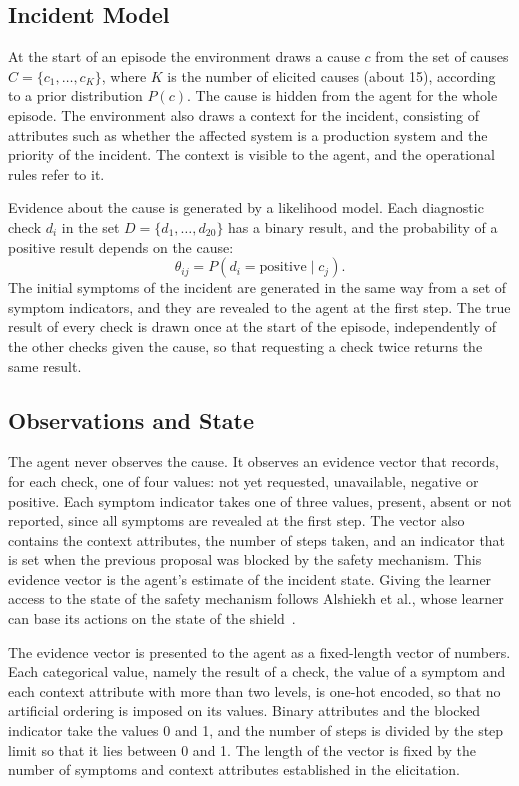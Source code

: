 \subsection{Incident Model}

At the start of an episode the environment draws a cause $c$ from the set of causes $C = \{c_1, \dots, c_{K}\}$, where $K$ is the number of elicited causes (about 15), according to a prior distribution $P(c)$. The cause is hidden from the agent for the whole episode. The environment also draws a context for the incident, consisting of attributes such as whether the affected system is a production system and the priority of the incident. The context is visible to the agent, and the operational rules refer to it.

Evidence about the cause is generated by a likelihood model. Each diagnostic check $d_i$ in the set $D = \{d_1, \dots, d_{20}\}$ has a binary result, and the probability of a positive result depends on the cause:
\begin{equation}
\theta_{ij} = P(d_i = \text{positive} \mid c_j).
\label{eq:likelihood}
\end{equation}
The initial symptoms of the incident are generated in the same way from a set of symptom indicators, and they are revealed to the agent at the first step. The true result of every check is drawn once at the start of the episode, independently of the other checks given the cause, so that requesting a check twice returns the same result.

\subsection{Observations and State}

The agent never observes the cause. It observes an evidence vector that records, for each check, one of four values: not yet requested, unavailable, negative or positive. Each symptom indicator takes one of three values, present, absent or not reported, since all symptoms are revealed at the first step. The vector also contains the context attributes, the number of steps taken, and an indicator that is set when the previous proposal was blocked by the safety mechanism. This evidence vector is the agent's estimate of the incident state. Giving the learner access to the state of the safety mechanism follows Alshiekh et al., whose learner can base its actions on the state of the shield~\cite{alshiekh2018}.

The evidence vector is presented to the agent as a fixed-length vector of numbers. Each categorical value, namely the result of a check, the value of a symptom and each context attribute with more than two levels, is one-hot encoded, so that no artificial ordering is imposed on its values. Binary attributes and the blocked indicator take the values 0 and 1, and the number of steps is divided by the step limit so that it lies between 0 and 1. The length of the vector is fixed by the number of symptoms and context attributes established in the elicitation.

